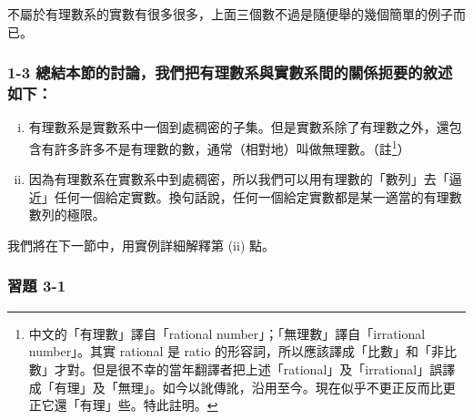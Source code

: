 不屬於有理數系的實數有很多很多，上面三個數不過是隨便舉的幾個簡單的例子而已。

\subsubsection*{1-3 總結本節的討論，我們把有理數系與實數系間的關係扼要的敘述如下：}

\begin{enumerate}[(i)]
    \item 有理數系是實數系中一個到處稠密的子集。但是實數系除了有理數之外，還包含有許多許多不是有理數的數，通常（相對地）叫做無理數。（註\footnote{中文的「有理數」譯自「rational number」；「無理數」譯自「irrational number」。其實 rational 是 ratio 的形容詞，所以應該譯成「比數」和「非比數」才對。但是很不幸的當年翻譯者把上述「rational」及「irrational」誤譯成「有理」及「無理」。如今以訛傳訛，沿用至今。現在似乎不更正反而比更正它還「有理」些。特此註明。}）
    \item 因為有理數系在實數系中到處稠密，所以我們可以用有理數的「數列」去「逼近」任何一個給定實數。換句話說，任何一個給定實數都是某一適當的有理數數列的極限。
\end{enumerate}
我們將在下一節中，用實例詳細解釋第 (ii) 點。

\subsubsection*{習題 3-1}

